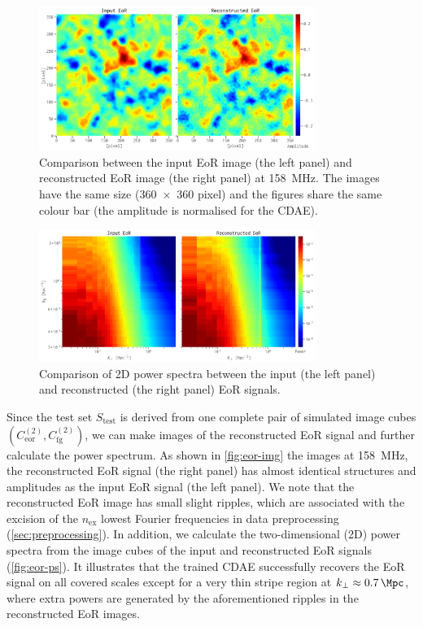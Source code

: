 \documentclass[fleqn,usenatbib]{mnras}
\newcommand{\R}[1]{\mathrm{#1}}
\newcommand{\editwip}[1]{{\leavevmode\color{magenta}#1}}
\begin{document}
\begin{figure}
  \centering
  \includegraphics[width=0.8\textwidth]{eor-img-comp}
  \caption{\label{fig:eor-img}\editwip{%
    Comparison between the input EoR image (the left panel) and
    reconstructed EoR image (the right panel) at \SI{158}{\MHz}.
    The images have the same size (\num{360 x 360} pixel) and the figures
    share the same colour bar (the amplitude is normalised for the CDAE).
  }}
\end{figure}

\begin{figure}
  \centering
  \includegraphics[width=0.8\textwidth]{eor-ps-comp}
  \caption{\label{fig:eor-ps}\editwip{%
    Comparison of 2D power spectra between the input (the left panel) and
    reconstructed (the right panel) EoR signals.
  }}
\end{figure}

\editwip{%
Since the test set $S_{\R{test}}$ is derived from one complete pair of
simulated image cubes $\left( C_{\R{eor}}^{(2)}, C_{\R{fg}}^{(2)} \right)$,
we can make images of the reconstructed EoR signal and further calculate
the power spectrum.
As shown in \autoref{fig:eor-img} the images at \SI{158}{\MHz}, the
reconstructed EoR signal (the right panel) has almost identical structures
and amplitudes as the input EoR signal (the left panel).
We note that the reconstructed EoR image has small slight ripples, which
are associated with the excision of the $n_{\R{ex}}$ lowest Fourier
frequencies in data preprocessing (\autoref{sec:preprocessing}).
In addition, we calculate the two-dimensional (2D) power spectra from the
image cubes of the input and reconstructed EoR signals
(\autoref{fig:eor-ps}).
It illustrates that the trained CDAE successfully recovers the EoR signal
on all covered scales except for a very thin stripe region at
$k_{\bot} \approx \SI{0.7}{\per\Mpc}$, where extra powers are generated
by the aforementioned ripples in the reconstructed EoR images.
} %
\end{document}
